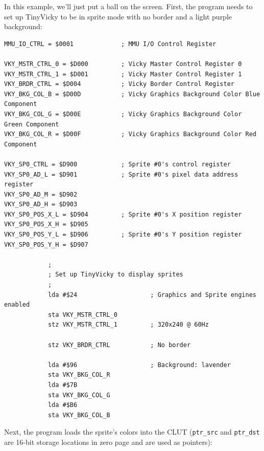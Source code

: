 In this example, we'll just put a ball on the screen. First, the program needs to set up TinyVicky to be in sprite mode with no border and a light purple background:

\begin{verbatim}
MMU_IO_CTRL = $0001             ; MMU I/O Control Register

VKY_MSTR_CTRL_0 = $D000         ; Vicky Master Control Register 0
VKY_MSTR_CTRL_1 = $D001         ; Vicky Master Control Register 1
VKY_BRDR_CTRL = $D004           ; Vicky Border Control Register
VKY_BKG_COL_B = $D00D           ; Vicky Graphics Background Color Blue Component
VKY_BKG_COL_G = $D00E           ; Vicky Graphics Background Color Green Component
VKY_BKG_COL_R = $D00F           ; Vicky Graphics Background Color Red Component

VKY_SP0_CTRL = $D900            ; Sprite #0's control register
VKY_SP0_AD_L = $D901            ; Sprite #0's pixel data address register
VKY_SP0_AD_M = $D902
VKY_SP0_AD_H = $D903
VKY_SP0_POS_X_L = $D904         ; Sprite #0's X position register
VKY_SP0_POS_X_H = $D905
VKY_SP0_POS_Y_L = $D906         ; Sprite #0's Y position register
VKY_SP0_POS_Y_H = $D907

            ;
            ; Set up TinyVicky to display sprites
            ;
            lda #$24                    ; Graphics and Sprite engines enabled
            sta VKY_MSTR_CTRL_0
            stz VKY_MSTR_CTRL_1         ; 320x240 @ 60Hz

            stz VKY_BRDR_CTRL           ; No border

            lda #$96                    ; Background: lavender
            sta VKY_BKG_COL_R
            lda #$7B
            sta VKY_BKG_COL_G
            lda #$B6
            sta VKY_BKG_COL_B
\end{verbatim}

Next, the program loads the sprite's colors into the CLUT (\verb+ptr_src+ and \verb+ptr_dst+ are 16-bit storage locations in zero page and are used as pointers):

